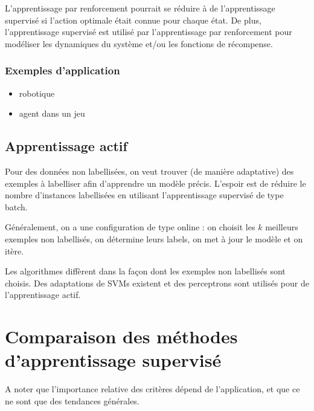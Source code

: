 			L'apprentissage par renforcement pourrait se réduire à de l'apprentissage supervisé si l'action optimale était connue pour chaque état. De plus, l'apprentissage supervisé est utilisé par l'apprentissage par renforcement pour modéliser les dynamiques du système et/ou les fonctions de récompense.
						
			\subsubsection{Exemples d'application}
			
			\begin{itemize}
				\item robotique
				\item agent dans un jeu
			\end{itemize}
		
		\subsection{Apprentissage actif}
		
		Pour des données non labellisées, on veut trouver (de manière adaptative) des exemples à labelliser afin d'apprendre un modèle précis. L'espoir est de réduire le nombre d'instances labellisées en utilisant l'apprentissage supervisé de type batch.
		
		Généralement, on a une configuration de type online : on choisit les $k$ meilleurs exemples non labellisés, on détermine leurs labels, on met à jour le modèle et on itère.
		
		Les algorithmes diffèrent dans la façon dont les exemples non labellisés sont choisis. Des adaptations de SVMs existent et des perceptrons sont utilisés pour de l'apprentissage actif.
		
\section{Comparaison des méthodes d'apprentissage supervisé}
	

A noter que l'importance relative des critères dépend de l'application, et que ce ne sont que des tendances générales.
